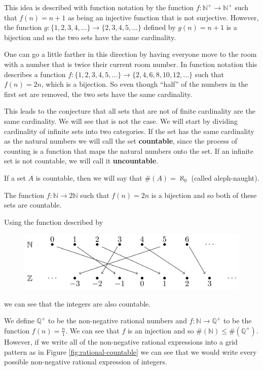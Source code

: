 \documentclass[
]{book}
\theoremstyle{definition}
\theoremstyle{definition}
\theoremstyle{definition}
\theoremstyle{definition}
\theoremstyle{remark}
\begin{document}
This idea is described with function notation by the function \(f:\mathbb{N}^+\rightarrow \mathbb{N}^+\) such that \(f(n)=n+1\) as being an injective function that is not surjective. However, the function \(g: \{1,2,3,4, \ldots\} \rightarrow \{2, 3,4,5, \ldots\}\) defined by \(g(n)=n+1\) is a bijection and so the two sets have the same cardinality.

One can go a little farther in this direction by having everyone move to the room with a number that is twice their current room number. In function notation this describes a function \(f: \{1, 2, 3, 4, 5, \ldots\} \rightarrow \{2, 4, 6, 8, 10, 12, \ldots\}\) such that \(f(n)=2n\), which is a bijection. So even though ``half'' of the numbers in the first set are removed, the two sets have the same cardinality.

This leads to the conjecture that all sets that are not of finite cardinality are the same cardinality. We will see that is not the case. We will start by dividing cardinality of infinite sets into two categories. If the set has the same cardinality as the natural numbers we will call the set \textbf{countable}, since the process of counting is a function that maps the natural numbers onto the set. If an infinite set is not countable, we will call it \textbf{uncountable}.

If a set \(A\) is countable, then we will say that \(\#(A)=\aleph_0\) (called aleph-naught).

The function \(f:\mathbb{N}\rightarrow 2\mathbb{N}\) such that \(f(n)=2n\) is a bijection and so both of these sets are countable.

Using the function described by

\begin{figure}

{\centering \includegraphics[width=1\linewidth]{tikz/table-natural-integers2} 

}

\end{figure}

we can see that the integers are also countable.

We define \(\mathbb{Q}^+\) to be the non-negative rational numbers and \(f:\mathbb{N}\rightarrow \mathbb{Q}^+\) to be the function \(f(n)=\frac{n}{1}\). We can see that \(f\) is an injection and so \(\#(\mathbb{N}) \leq \#(\mathbb{Q}^+)\). However, if we write all of the non-negative rational expressions into a grid pattern as in Figure \ref{fig:rational-countable} we can see that we would write every possible non-negative rational expression of integers.
\end{document}
